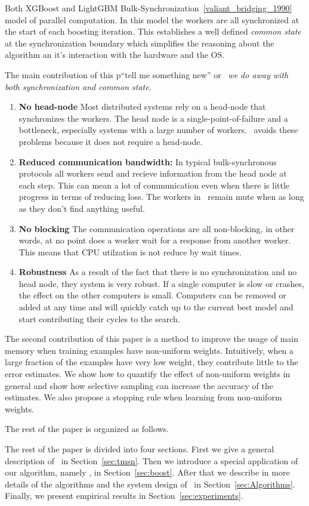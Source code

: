 Both XGBoost and LightGBM 
Bulk-Synchronization~\ref{valiant_bridging_1990} model of parallel
computation. In this model the workers are all synchronized at the
start of each boosting iteration. This establishes a well defined {\em
  common state} at the synchronization boundary which simplifies the
reasoning about the algorithm an it's interaction with the hardware
and the OS.

The main contribution of this p``tell me something new'' or
\tmsn\ {\em we do away with both synchronization and common state}.

\begin{enumerate}
\item {\bf No head-node} Most distributed systems rely on a head-node
  that synchronizes the workers. The head node is a
  single-point-of-failure and a bottleneck, especially systems with a
  large number of workers. \tmsn\ avoids these problems because it
  does not require a head-node.
\item {\bf Reduced communication bandwidth:} In typical bulk-synchronous
  protocols all workers send and recieve information from the head
  node at each step. This can mean a lot of communication even when
  there is little progress in terms of reducing loss. The workers in
  \tmsn\ remain mute when as long as they don't find anything useful.
\item {\bf No blocking} The communication operations are all
  non-blocking, in other words, at no point does a worker wait for a
  response from another worker. This means that CPU utilzation is not
  reduce by wait times.
\item {\bf Robustness} As a result of the fact that there is no
  synchronization and no head node, they system is very robust. If a
  single computer is slow or crashes, the effect on the other
  computers is small. Computers can be removed or added at any time
  and will quickly catch up to the current best model and start
  contributing their cycles to the search.
\end{enumerate}

The second contribution of this paper is a method to improve the usage
of main memory when training examples have non-uniform
weights. Intuitively, when a large fraction of the examples have very
low weight, they contribute little to the error estimates. We show how
to quantify the effect of non-uniform weights in general and show how
selective sampling can increase the accuracy of the estimates. We also
propose a stopping rule when learning from non-uniform weights.

The rest of the paper is organized as follows.

The rest of the paper is divided into four sections.
First we give a general description of \tmsn\ in Section~\ref{sec:tmsn}.
Then we introduce a special application of our algorithm, namely \Sparrow, in Section~\ref{sec:boost}.
After that we describe in more details of the algorithms and the system design of \Sparrow\ in
Section~\ref{sec:Algorithms}.
Finally, we present empirical results in Section~\ref{sec:experiments}.

